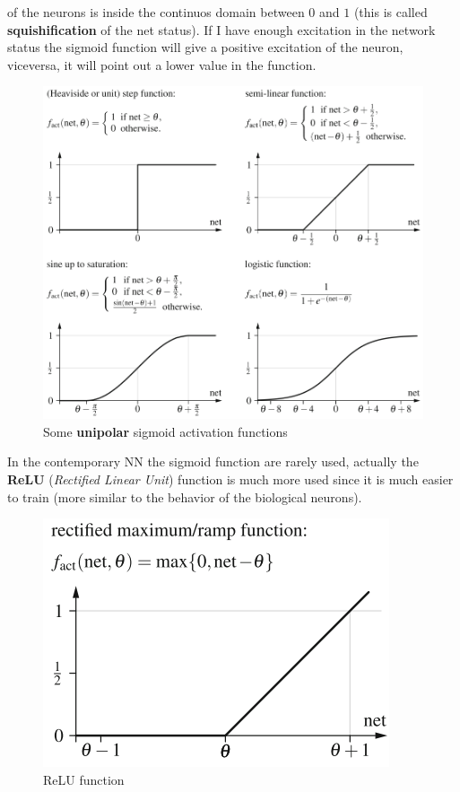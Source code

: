 \documentclass{article}
\begin{document}
of the neurons is inside the continuos domain between $0$ and $1$ (this is called \textbf{squishification} of the net status).
If I have enough excitation in the network status the sigmoid function will give a positive excitation of the neuron,
viceversa, it will point out a lower value in the function.
\begin{figure}[H]
    \includegraphics[scale=0.45]{images/sigmoid_functions.png}
    \centering
    \caption{Some \textbf{unipolar} sigmoid activation functions}
\end{figure}
In the contemporary NN the sigmoid function are rarely used, actually the \textbf{ReLU} (\textit{Rectified Linear Unit})
function is much more used since it is much easier to train (more similar to the behavior of the biological neurons).
\begin{figure}[H]
    \centering
    \includegraphics[scale=0.5]{images/relu.png}
    \caption{ReLU function}
\end{figure}
\end{document}
